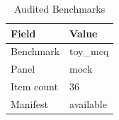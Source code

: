 \begin{table}[t]
\centering
\caption{Audited Benchmarks}
\begin{tabular}{ll}
\toprule
Field & Value \\
\midrule
Benchmark & toy\_mcq \\
Panel & mock \\
Item count & 36 \\
Manifest & available \\
\bottomrule
\end{tabular}
\end{table}
